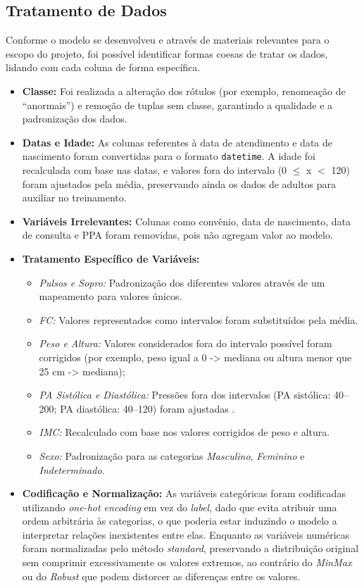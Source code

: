 \documentclass[conference]{IEEEtran}
\begin{document}
\subsection{Tratamento de Dados}
Conforme o modelo se desenvolveu e através de materiais relevantes para o escopo do projeto, foi possível identificar formas coesas de tratar os dados, lidando com cada coluna de forma específica.
\begin{itemize}
    \item \textbf{Classe:} Foi realizada a alteração dos rótulos (por exemplo, renomeação de “anormais”) e remoção de tuplas sem classe, garantindo a qualidade e a padronização dos dados.
    \item \textbf{Datas e Idade:} As colunas referentes à data de atendimento e data de nascimento foram convertidas para o formato \texttt{datetime}. A idade foi recalculada com base nas datas, e valores fora do intervalo (0 $\leq$ x $<$ 120) foram ajustados pela média, preservando ainda os dados de adultos para auxiliar no treinamento.
    \item \textbf{Variáveis Irrelevantes:} Colunas como convênio, data de nascimento, data de consulta e PPA foram removidas, pois não agregam valor ao modelo.
    \item \textbf{Tratamento Específico de Variáveis:}
    \begin{itemize}
        \item \emph{Pulsos e Sopro:} Padronização dos diferentes valores através de um mapeamento para valores únicos.
        \item \emph{FC:} Valores representados como intervalos foram substituídos pela média. 
        \item \emph{Peso e Altura:} Valores considerados fora do intervalo possível foram corrigidos (por exemplo, peso igual a 0 -> mediana ou altura menor que 25 cm -> mediana); 
        \item \emph{PA Sistólica e Diastólica:} Pressões fora dos intervalos (PA sistólica: 40--200; PA diastólica: 40--120) foram ajustadas \cite{ref:ESC2018}.
        \item \emph{IMC:} Recalculado com base nos valores corrigidos de peso e altura.
        \item \emph{Sexo:} Padronização para as categorias \emph{Masculino}, \emph{Feminino} e \emph{Indeterminado}.
    \end{itemize}
    \item \textbf{Codificação e Normalização:} As variáveis categóricas foram codificadas utilizando \emph{one-hot encoding} em vez do \emph{label}, dado que evita atribuir uma ordem arbitrária às categorias, o que poderia estar induzindo o modelo a interpretar relações inexistentes entre elas. Enquanto as variáveis numéricas foram normalizadas pelo método \emph{standard}, preservando a distribuição original sem comprimir excessivamente os valores extremos, ao contrário do \emph{MinMax} ou do \emph{Robust} que podem distorcer as diferenças entre os valores.

\end{itemize}
\end{document}

